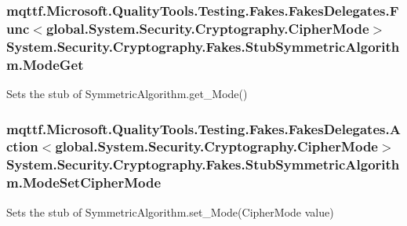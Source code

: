 \hypertarget{class_system_1_1_security_1_1_cryptography_1_1_fakes_1_1_stub_symmetric_algorithm_a93c9a60fc66d5fdd3179b540659fff6b}{
\subsubsection[{Mode\-Get}]{\setlength{\rightskip}{0pt plus 5cm}mqttf.\-Microsoft.\-Quality\-Tools.\-Testing.\-Fakes.\-Fakes\-Delegates.\-Func$<$global.\-System.\-Security.\-Cryptography.\-Cipher\-Mode$>$ System.\-Security.\-Cryptography.\-Fakes.\-Stub\-Symmetric\-Algorithm.\-Mode\-Get}}\label{class_system_1_1_security_1_1_cryptography_1_1_fakes_1_1_stub_symmetric_algorithm_a93c9a60fc66d5fdd3179b540659fff6b}


Sets the stub of Symmetric\-Algorithm.\-get\-\_\-\-Mode()

\hypertarget{class_system_1_1_security_1_1_cryptography_1_1_fakes_1_1_stub_symmetric_algorithm_aa60e538628a33f89cd9d7c6f818a4e95}{
\subsubsection[{Mode\-Set\-Cipher\-Mode}]{\setlength{\rightskip}{0pt plus 5cm}mqttf.\-Microsoft.\-Quality\-Tools.\-Testing.\-Fakes.\-Fakes\-Delegates.\-Action$<$global.\-System.\-Security.\-Cryptography.\-Cipher\-Mode$>$ System.\-Security.\-Cryptography.\-Fakes.\-Stub\-Symmetric\-Algorithm.\-Mode\-Set\-Cipher\-Mode}}\label{class_system_1_1_security_1_1_cryptography_1_1_fakes_1_1_stub_symmetric_algorithm_aa60e538628a33f89cd9d7c6f818a4e95}


Sets the stub of Symmetric\-Algorithm.\-set\-\_\-\-Mode(\-Cipher\-Mode value)

